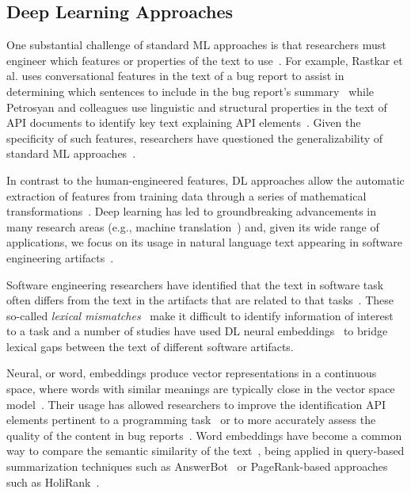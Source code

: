 \subsection{Deep Learning Approaches}
\label{cp2:deep-learning}



One substantial challenge of standard \acf{ML}
approaches is that researchers must engineer which 
features or properties of the text to use~\cite{ferreira2021}.
For example, Rastkar et al. uses conversational features in 
the text of a bug report to assist in determining which sentences 
to include in the bug report's summary~\cite{Rastkar2010}
while Petrosyan and colleagues use 
linguistic and structural properties 
in the text of API documents to identify key text 
explaining API elements~\cite{Petrosyan2015}.
Given the specificity of such features, 
researchers have questioned the generalizability
of standard \acs{ML} approaches~\cite{Xiao2018, fucci2019}.



In contrast to the human-engineered features,
\acf{DL} approaches allow the automatic extraction of features 
from training data through a series of mathematical transformations~\cite{Deng2018, zhang2021deep}.
Deep learning has led to groundbreaking advancements in many 
research areas (e.g., machine translation~\cite{lopez2008translation}) 
and, given its wide range of applications, 
we focus
on its usage in natural language text appearing in software engineering artifacts~\cite{ferreira2021, li2018deep, watson2022}.









Software engineering researchers have identified that the text 
in software task 
often differs from the text in the artifacts that are related to that tasks~\cite{Huang2018}. 
These so-called \textit{lexical mismatches}~\cite{Ye2016} 
 make it difficult to identify information of interest 
to a task and a number of studies have used \acs{DL}
neural embeddings~\cite{Mikolov2013} to bridge lexical gaps between the text of different software artifacts. 


Neural, or word, embeddings produce vector representations in a continuous space,
where words with similar meanings are typically close in the vector space model~\cite{harris1954distributional, mikolov2013efficient}. 
Their usage has allowed researchers to improve 
the identification API elements pertinent to a programming task~\cite{Ye2016} 
or to more accurately assess the quality of the content in bug reports~\cite{chaparro2019}.
Word embeddings have become a common way 
to compare the semantic similarity of the text~\cite{mihalcea2006},
being applied in query-based summarization techniques such as 
AnswerBot~\cite{Xu2017}
or PageRank-based approaches such as HoliRank~\cite{Ponzanelli2017}.



